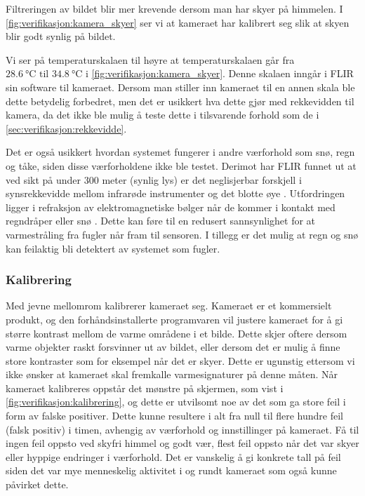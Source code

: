 Filtreringen av bildet blir mer krevende dersom man har skyer på himmelen. 
I \autoref{fig:verifikasjon:kamera_skyer} ser vi at kameraet har kalibrert seg slik at skyen blir godt synlig på bildet. 

Vi ser på temperaturskalaen til høyre at temperaturskalaen går fra $\SI{28.6}{\celsius} \text{ til } \SI{34.8}{\celsius}$ i \autoref{fig:verifikasjon:kamera_skyer}. Denne skalaen inngår i FLIR sin software til kameraet.
Dersom man stiller inn kameraet til en annen skala ble dette betydelig forbedret, men det er usikkert hva dette gjør med rekkevidden til kamera, da det ikke ble mulig å teste dette i tilsvarende forhold som de i \autoref{sec:verifikasjon:rekkevidde}.

Det er også usikkert hvordan systemet fungerer i andre værforhold som snø, regn og tåke, siden disse værforholdene ikke ble testet.
Derimot har FLIR funnet ut at ved sikt på under 300 meter (synlig lys) er det neglisjerbar forskjell i synsrekkevidde mellom infrarøde instrumenter og det blotte øye \cite{tåke}.
Utfordringen ligger i refraksjon av elektromagnetiske bølger når de kommer i kontakt med regndråper eller snø \cite{refraksjon}.
Dette kan føre til en redusert sannsynlighet for at varmestråling fra fugler når fram til sensoren. I tillegg er det mulig at regn og snø kan feilaktig bli detektert av systemet som fugler.

\newpage
\subsubsection{Kalibrering}\label{sec:verifikasjon:kamera:kalibrering}

Med jevne mellomrom kalibrerer kameraet seg. 
Kameraet er et kommersielt produkt, og den forhåndsinstallerte programvaren vil justere kameraet for å gi større kontrast mellom de varme områdene i et bilde. 
Dette skjer oftere dersom varme objekter raskt forsvinner ut av bildet, eller dersom det er mulig å finne store kontraster som for eksempel når det er skyer. 
Dette er ugunstig ettersom vi ikke ønsker at kameraet skal fremkalle varmesignaturer på denne måten. 
Når kameraet kalibreres oppstår det mønstre på skjermen, som vist i \autoref{fig:verifikasjon:kalibrering}, og dette er utvilsomt noe av det som ga store feil i form av falske positiver.
Dette kunne resultere i alt fra null til flere hundre feil (falsk positiv) i timen, avhengig av værforhold og innstillinger på kameraet. 
Få til ingen feil oppsto ved skyfri himmel og godt vær, flest feil oppsto når det var skyer eller hyppige endringer i værforhold. 
Det er vanskelig å gi konkrete tall på feil siden det var mye menneskelig aktivitet i og rundt kameraet som også kunne påvirket dette.

